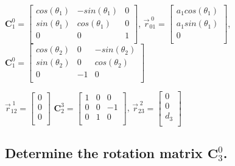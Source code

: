 \documentclass[12pt,letterpaper, onecolumn]{exam}
\begin{document}
\begin{questions}
{        \centering
        $\mathbf{C}_1^0 =
            \begin{bmatrix}
                cos(\theta_1) & -sin(\theta_1) & 0 \\
                sin(\theta_1) & cos(\theta_1)  & 0 \\
                0             & 0              & 1 \\
            \end{bmatrix}
        $,
        $\vec{r}^{\;0}_{01} =
            \begin{bmatrix}
                a_1cos(\theta_1) \\
                a_1sin(\theta_1) \\
                0                \\
            \end{bmatrix}
        $,
        $\mathbf{C}_1^0 =
            \begin{bmatrix}
                cos(\theta_2) & 0  & -sin(\theta_2) \\
                sin(\theta_2) & 0  & cos(\theta_2)  \\
                0             & -1 & 0              \\
            \end{bmatrix}
        $

        \qquad \qquad \qquad \qquad \quad
        $\vec{r}^{\;1}_{12} =
            \begin{bmatrix}
                0 \\
                0 \\
                0 \\
            \end{bmatrix}$
        $\mathbf{C}_2^3 =
            \begin{bmatrix}
                1 & 0 & 0  \\
                0 & 0 & -1 \\
                0 & 1 & 0  \\
            \end{bmatrix}
        $,\quad
        $\vec{r}^{\;2}_{23} =
            \begin{bmatrix}
                0   \\
                0   \\
                d_3 \\
            \end{bmatrix}
        $
    }
    \begin{parts}
        \part{Determine the rotation matrix $\mathbf{C}_3^0$.}


\end{parts}
\end{questions}
\end{document}

